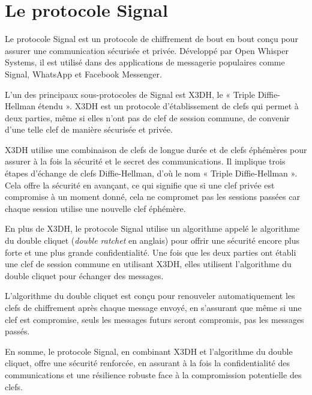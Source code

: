 
\section{Le protocole Signal} %
\label{sec:signal}

Le protocole Signal est un protocole de chiffrement de bout en bout conçu pour assurer une communication sécurisée et privée. Développé par Open Whisper Systems, il est utilisé dans des applications de messagerie populaires comme Signal, WhatsApp et Facebook Messenger.\par

L'un des principaux sous-protocoles de Signal est X3DH, le « Triple Diffie-Hellman étendu ». X3DH est un protocole d'établissement de clefs qui permet à deux parties, même si elles n'ont pas de clef de session commune, de convenir d’une telle clef de manière sécurisée et privée.\par

X3DH utilise une combinaison de clefs de longue durée et de clefs éphémères pour assurer à la fois la sécurité et le secret des communications. Il implique trois étapes d’échange de clefs Diffie-Hellman, d’où le nom « Triple Diffie-Hellman ». Cela offre la sécurité en avançant, ce qui signifie que si une clef privée est compromise à un moment donné, cela ne compromet pas les sessions passées car chaque session utilise une nouvelle clef éphémère.\par

En plus de X3DH, le protocole Signal utilise un algorithme appelé le algorithme du double cliquet (\emph{double ratchet} en anglais) pour offrir une sécurité encore plus forte et une plus grande confidentialité. Une fois que les deux parties ont établi une clef de session commune en utilisant X3DH, elles utilisent l'algorithme du double cliquet pour échanger des messages.\par

L'algorithme du double cliquet est conçu pour renouveler automatiquement les clefs de chiffrement après chaque message envoyé, en s'assurant que même si une clef est compromise, seuls les messages futurs seront compromis, pas les messages passés.

En somme, le protocole Signal, en combinant X3DH et l'algorithme du double cliquet, offre une sécurité renforcée, en assurant à la fois la confidentialité des communications et une résilience robuste face à la compromission potentielle des clefs.\par


